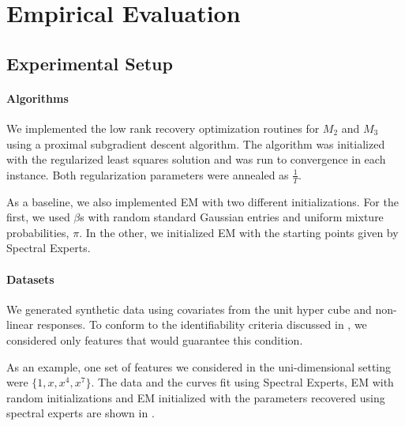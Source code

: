 \section{Empirical Evaluation}
\label{sec:evaluation}


\subsection{Experimental Setup}

\paragraph{Algorithms}

We implemented the low rank recovery optimization routines for $M_2$ and
$M_3$ using a proximal subgradient descent algorithm\citationneeded. The
algorithm was initialized with the regularized least squares solution
and was run to convergence in each instance. Both regularization
parameters were annealed as $\frac{1}{T}$. 

As a baseline, we also implemented EM with two different
initializations. For the first, we used $\beta$s with random standard
Gaussian entries and uniform mixture probabilities, $\pi$. In the other,
we initialized EM with the starting points given by Spectral Experts. 

\paragraph{Datasets}

We generated synthetic data using covariates from the unit hyper cube
and non-linear responses.  To conform to the identifiability criteria
discussed in , we considered only features that
would guarantee this condition. 

As an example, one set of features we considered in the uni-dimensional
setting were $\{1, x, x^4, x^7\}$. The data and the curves fit using
Spectral Experts, EM with random initializations and EM initialized with
the parameters recovered using spectral experts are shown in
.

